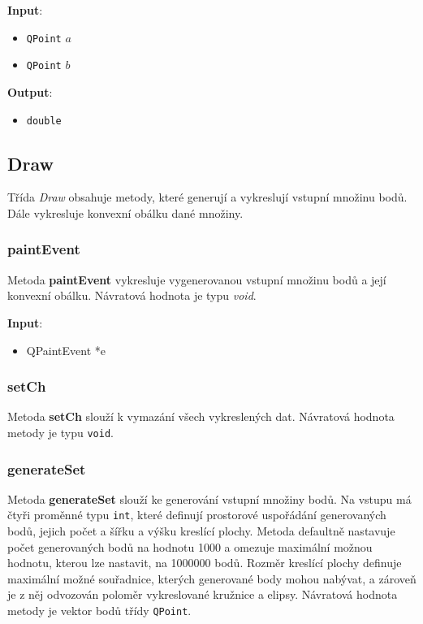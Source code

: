 \documentclass[a4paper, 12pt]{article}
\begin{document}
\textbf{Input}:
\begin{itemize}
\item \texttt{QPoint} $a$ 
\item \texttt{QPoint} $b$
\end{itemize}

\textbf{Output}:
\begin{itemize}
\item \texttt{double} 
\end{itemize}

\subsection{Draw}
Třída \textit{Draw} obsahuje metody, které generují a vykreslují vstupní množinu bodů. Dále vykresluje konvexní obálku dané množiny. 

\subsubsection*{paintEvent}
Metoda \textbf{paintEvent} vykresluje vygenerovanou vstupní množinu bodů a její konvexní obálku. Návratová hodnota je typu \textit{void}.

\textbf{Input}:
\begin{itemize}
\item QPaintEvent *e
\end{itemize}

\subsubsection*{setCh}
Metoda \textbf{setCh} slouží k vymazání všech vykreslených dat. Návratová hodnota metody je typu \texttt{void}.

\subsubsection*{generateSet}
Metoda \textbf{generateSet} slouží ke generování vstupní množiny bodů. Na vstupu má čtyři proměnné typu \texttt{int}, které definují prostorové uspořádání generovaných bodů, jejich počet a šířku a výšku kreslící plochy. Metoda defaultně nastavuje počet generovaných bodů na hodnotu 1000 a omezuje maximální možnou hodnotu, kterou lze nastavit, na 1000000 bodů. Rozměr kreslící plochy definuje maximální možné souřadnice, kterých generované body mohou nabývat, a zároveň je z něj odvozován poloměr vykreslované kružnice a elipsy. Návratová hodnota metody je vektor bodů třídy \texttt{QPoint}.\\
\end{document}
